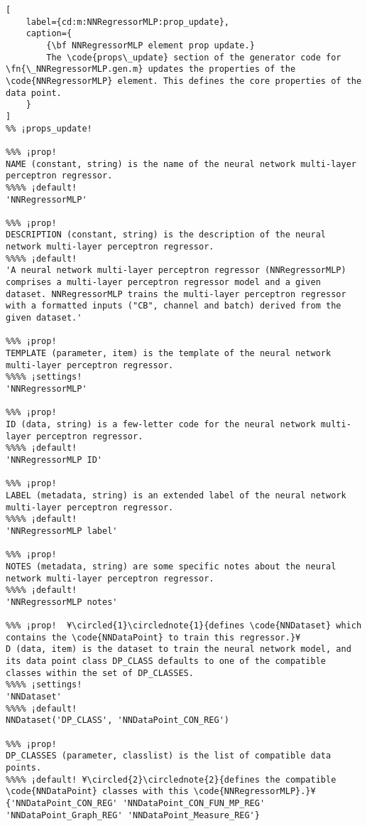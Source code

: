 \documentclass{tufte-handout}
\begin{document}
\begin{lstlisting}[
	label={cd:m:NNRegressorMLP:prop_update},
	caption={
		{\bf NNRegressorMLP element prop update.}
		The \code{props\_update} section of the generator code for \fn{\_NNRegressorMLP.gen.m} updates the properties of the \code{NNRegressorMLP} element. This defines the core properties of the data point.
	}
]
%% ¡props_update!

%%% ¡prop!
NAME (constant, string) is the name of the neural network multi-layer perceptron regressor.
%%%% ¡default!
'NNRegressorMLP'

%%% ¡prop!
DESCRIPTION (constant, string) is the description of the neural network multi-layer perceptron regressor.
%%%% ¡default!
'A neural network multi-layer perceptron regressor (NNRegressorMLP) comprises a multi-layer perceptron regressor model and a given dataset. NNRegressorMLP trains the multi-layer perceptron regressor with a formatted inputs ("CB", channel and batch) derived from the given dataset.'

%%% ¡prop!
TEMPLATE (parameter, item) is the template of the neural network multi-layer perceptron regressor.
%%%% ¡settings!
'NNRegressorMLP'

%%% ¡prop!
ID (data, string) is a few-letter code for the neural network multi-layer perceptron regressor.
%%%% ¡default!
'NNRegressorMLP ID'

%%% ¡prop!
LABEL (metadata, string) is an extended label of the neural network multi-layer perceptron regressor.
%%%% ¡default!
'NNRegressorMLP label'

%%% ¡prop!
NOTES (metadata, string) are some specific notes about the neural network multi-layer perceptron regressor.
%%%% ¡default!
'NNRegressorMLP notes'

%%% ¡prop!  ¥\circled{1}\circlednote{1}{defines \code{NNDataset} which contains the \code{NNDataPoint} to train this regressor.}¥
D (data, item) is the dataset to train the neural network model, and its data point class DP_CLASS defaults to one of the compatible classes within the set of DP_CLASSES.
%%%% ¡settings!
'NNDataset'
%%%% ¡default!
NNDataset('DP_CLASS', 'NNDataPoint_CON_REG')

%%% ¡prop!
DP_CLASSES (parameter, classlist) is the list of compatible data points.
%%%% ¡default! ¥\circled{2}\circlednote{2}{defines the compatible \code{NNDataPoint} classes with this \code{NNRegressorMLP}.}¥
{'NNDataPoint_CON_REG' 'NNDataPoint_CON_FUN_MP_REG' 'NNDataPoint_Graph_REG' 'NNDataPoint_Measure_REG'}


\end{lstlisting}
\end{document}
